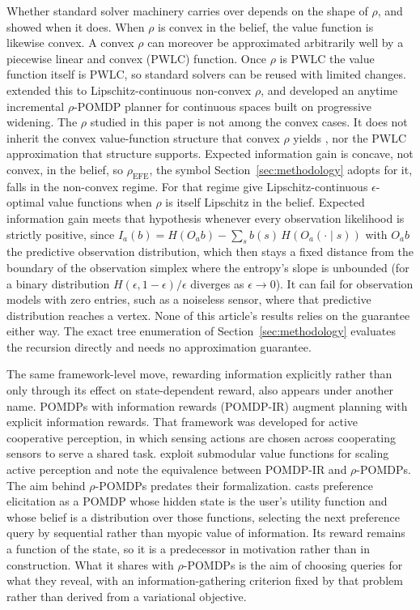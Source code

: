 Whether standard solver machinery carries over depends on the shape of $\rho$, and \citet{araya2010} showed when it does. When $\rho$ is convex in the belief, the value function is likewise convex. A convex $\rho$ can moreover be approximated arbitrarily well by a piecewise linear and convex (PWLC) function. Once $\rho$ is PWLC the value function itself is PWLC, so standard solvers can be reused with limited changes. \citet{fehr2018} extended this to Lipschitz-continuous non-convex $\rho$, and \citet{benchetrit2025} developed an anytime incremental $\rho$-POMDP planner for continuous spaces built on progressive widening. The $\rho$ studied in this paper is not among the convex cases. It does not inherit the convex value-function structure that convex $\rho$ yields \citep{araya2010}, nor the PWLC approximation that structure supports. Expected information gain is concave, not convex, in the belief, so $\rho_{\mathrm{EFE}}$, the symbol Section~\ref{sec:methodology} adopts for it, falls in the non-convex regime. For that regime \citet{fehr2018} give Lipschitz-continuous $\epsilon$-optimal value functions when $\rho$ is itself Lipschitz in the belief. Expected information gain meets that hypothesis whenever every observation likelihood is strictly positive, since $I_a(b) = H(O_a b) - \sum_s b(s)\, H(O_a(\cdot \mid s))$ with $O_a b$ the predictive observation distribution, which then stays a fixed distance from the boundary of the observation simplex where the entropy's slope is unbounded (for a binary distribution $H(\epsilon, 1-\epsilon)/\epsilon$ diverges as $\epsilon \to 0$). It can fail for observation models with zero entries, such as a noiseless sensor, where that predictive distribution reaches a vertex. None of this article's results relies on the guarantee either way. The exact tree enumeration of Section~\ref{sec:methodology} evaluates the recursion directly and needs no approximation guarantee.

The same framework-level move, rewarding information explicitly rather than only through its effect on state-dependent reward, also appears under another name. POMDPs with information rewards (POMDP-IR) \citep{spaan2015} augment planning with explicit information rewards. That framework was developed for active cooperative perception, in which sensing actions are chosen across cooperating sensors to serve a shared task. \citet{satsangi2018} exploit submodular value functions for scaling active perception and note the equivalence between POMDP-IR and $\rho$-POMDPs. The aim behind $\rho$-POMDPs predates their formalization. \citet{boutilier2002} casts preference elicitation as a POMDP whose hidden state is the user's utility function and whose belief is a distribution over those functions, selecting the next preference query by sequential rather than myopic value of information. Its reward remains a function of the state, so it is a predecessor in motivation rather than in construction. What it shares with $\rho$-POMDPs is the aim of choosing queries for what they reveal, with an information-gathering criterion fixed by that problem rather than derived from a variational objective.

